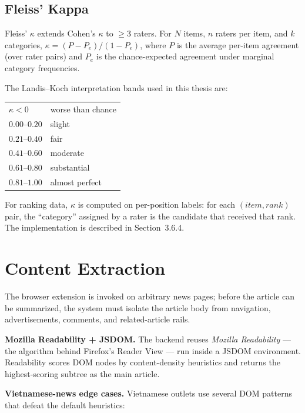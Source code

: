 \subsection{Fleiss' Kappa}

Fleiss' $\kappa$ \cite{Landis1977} extends Cohen's $\kappa$ to
$\geq 3$ raters. For $N$ items, $n$ raters per item, and $k$ categories,
$\kappa = (P - P_e) / (1 - P_e)$, where $P$ is the average per-item
agreement (over rater pairs) and $P_e$ is the chance-expected agreement
under marginal category frequencies.

The Landis--Koch interpretation bands used in this thesis are:

\begin{tabular}{ll}
$\kappa < 0$       & worse than chance \\
$0.00$--$0.20$     & slight \\
$0.21$--$0.40$     & fair \\
$0.41$--$0.60$     & moderate \\
$0.61$--$0.80$     & substantial \\
$0.81$--$1.00$     & almost perfect \\
\end{tabular}

For ranking data, $\kappa$ is computed on per-position labels: for each
$(item, rank)$ pair, the ``category'' assigned by a rater is the candidate
that received that rank. The implementation is described in
Section~3.6.4.

\section{Content Extraction}

The browser extension is invoked on arbitrary news pages; before the article
can be summarized, the system must isolate the article body from
navigation, advertisements, comments, and related-article rails.

\textbf{Mozilla Readability + JSDOM.} The backend reuses
\textit{Mozilla Readability} --- the algorithm behind Firefox's Reader View
--- run inside a JSDOM environment. Readability scores DOM nodes by
content-density heuristics and returns the highest-scoring subtree as the
main article.

\textbf{Vietnamese-news edge cases.} Vietnamese outlets use several
DOM patterns that defeat the default heuristics:

